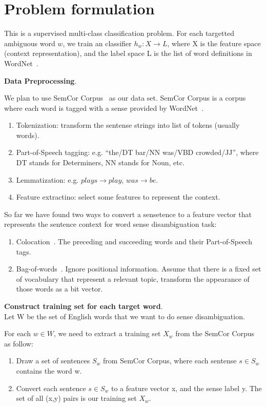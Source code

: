 \section{Problem formulation}

This is a supervised multi-class classification problem. For each targetted
ambiguous word $w$, we train an classifier $h_w: X \rightarrow L$, where X is
the feature space (context representation), and the label space L is the list of word
definitions in WordNet~\cite{wordnet}.

\textbf{Data Preprocessing}.

We plan to use SemCor Corpus~\cite{semcor} as our data set. SemCor Corpus is a
corpus where each word is tagged with a sense provided by WordNet~\cite{wordnet}.

\begin{enumerate}
  \item Tokenization: transform the sentense strings into list of tokens
    (usually words).
  \item Part-of-Speech tagging: e.g. ``the/DT bar/NN was/VBD crowded/JJ'', where
    DT stands for Determiners, NN stands for Noun, etc.
  \item Lemmatization: e.g. $plays \rightarrow play$, $was \rightarrow be$.
  \item Feature extractino: select some features to represent the context.
\end{enumerate}

So far we have found two ways to convert a
sensetence to a feature vector that represents the sentence context for word
sense disambiguation task:
\begin{enumerate}
  \item Colocation~\cite{colocation}. The preceding and succeeding words and
    their Part-of-Speech tags.
  \item Bag-of-words~\cite{bagofwords}. Ignore positional information. Assume
    that there is a fixed set of vocabulary that represent a relevant topic,
    transform the appearance of those words as a bit vector.
\end{enumerate}

\textbf{Construct training set for each target word}.\\
Let W be the set of English words that we want to do sense disambiguation. 

For each $w \in W$, we need to extract a training set $X_w$ from the SemCor
Corpus as follow: 
\begin{enumerate}
  \item Draw a set of sentences $S_w$ from SemCor Corpus, where each sentense
$s \in S_w$ contains the word w. 
  \item Convert each sentence $s \in S_w$ to a feature vector x, and the sense
    label y. The set of all (x,y) pairs is our training set $X_w$.
\end{enumerate}

